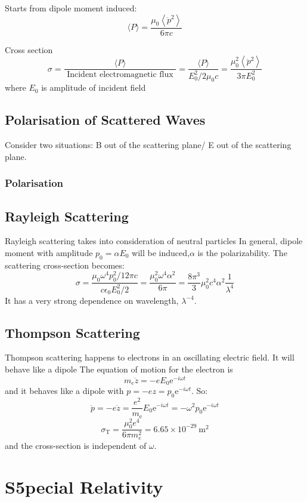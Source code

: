 \documentclass[12pt,a4paper]{article}
\begin{document}
Starts from dipole moment induced:
$$
\langle P\rangle=\frac{\mu_0\left\langle\ddot{p}^2\right\rangle}{6 \pi c}
$$
\begin{definition}
    {Cross section}{$$
    \sigma=\frac{\langle P\rangle}{\text { Incident electromagnetic flux }}=\frac{\langle P\rangle}{E_0^2 / 2 \mu_0 c}=\frac{\mu_0^2\left\langle\ddot{p}^2\right\rangle}{3 \pi E_0^2}
    $$}{where $E_0$ is amplitude of incident field}
\end{definition}

\subsection{Polarisation of Scattered Waves}
Consider two situations: B out of the scattering plane/ E out of the scattering plane.
\subsubsection{Polarisation}

\subsection{Rayleigh Scattering}
Rayleigh scattering takes into consideration of neutral particles
In general,  dipole moment with amplitude $p_0=\alpha E_0$ will be induced,$\alpha$ is the polarizability.
The scattering cross-section becomes:
$$
\sigma=\frac{\mu_0 \omega^4 p_0^2 / 12 \pi c}{c \epsilon_0 E_0^2 / 2}=\frac{\mu_0^2 \omega^4 \alpha^2}{6 \pi}=\frac{8 \pi^3}{3} \mu_0^2 c^4 \alpha^2 \frac{1}{\lambda^4}
$$ 
It has a very strong dependence on wavelength, $\lambda^{-4}$.
\subsection{Thompson Scattering}
Thompson scattering happens to electrons in an oscillating electric field. It will behave like a dipole
The equation of motion for the electron is
$$
m_e \ddot{z}=-e E_0 \mathrm{e}^{-i \omega t}
$$
and it behaves like a dipole with $p=-e z=p_0 \mathrm{e}^{-i \omega t}$. So:
$$
\ddot{p}=-e \ddot{z}=\frac{e^2}{m_{\mathrm{e}}} E_0 \mathrm{e}^{-i \omega t}=-\omega^2 p_0 \mathrm{e}^{-i \omega t}
$$
$$
\sigma_{\mathrm{T}}=\frac{\mu_0^2 e^4}{6 \pi m_e^2}=6.65 \times 10^{-29} \mathrm{~m}^2
$$
and the cross-section is independent of $\omega$.

\section{S5pecial Relativity}
\end{document}
